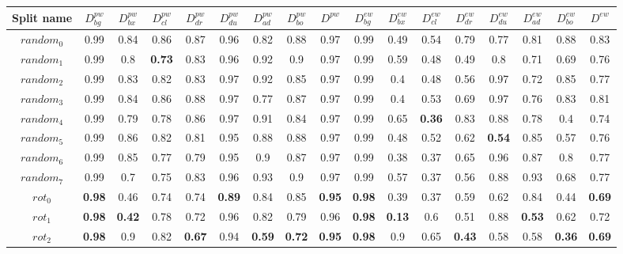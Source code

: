\documentclass{article}
\begin{document}
\begin{center} 
\begin{table}[H]
\tiny \renewcommand{\arraystretch}{1.5} \begin{tabular}{ |c|c|c|c|c|c|c|c|c||c|c|c|c|c|c|c|c| } \hline Split name & $D^{pw}_{bg}$ & $D^{pw}_{bx}$ & $D^{pw}_{cl}$ & $D^{pw}_{dr}$ & $D^{pw}_{du}$ & $D^{pw}_{ad}$ & $D^{pw}_{bo}$ & $D^{pw}$ &  $D^{ew}_{bg}$ & $D^{ew}_{bx}$ & $D^{ew}_{cl}$ & $D^{ew}_{dr}$ & $D^{ew}_{du}$ & $D^{ew}_{ad}$ & $D^{ew}_{bo}$ & $D^{ew}$ \\ [1.05ex] \hline 
$random_0$ &  0.99 & 0.84 & 0.86 & 0.87 & 0.96 & 0.82 & 0.88 & 0.97 &  0.99 & 0.49 & 0.54 & 0.79 & 0.77 & 0.81 & 0.88 & 0.83 \\ \hline 
$random_1$ &  0.99 & 0.8 & \textbf{0.73} & 0.83 & 0.96 & 0.92 & 0.9 & 0.97 &  0.99 & 0.59 & 0.48 & 0.49 & 0.8 & 0.71 & 0.69 & 0.76 \\ \hline 
$random_2$ &  0.99 & 0.83 & 0.82 & 0.83 & 0.97 & 0.92 & 0.85 & 0.97 &  0.99 & 0.4 & 0.48 & 0.56 & 0.97 & 0.72 & 0.85 & 0.77 \\ \hline 
$random_3$ &  0.99 & 0.84 & 0.86 & 0.88 & 0.97 & 0.77 & 0.87 & 0.97 &  0.99 & 0.4 & 0.53 & 0.69 & 0.97 & 0.76 & 0.83 & 0.81 \\ \hline 
$random_4$ &  0.99 & 0.79 & 0.78 & 0.86 & 0.97 & 0.91 & 0.84 & 0.97 &  0.99 & 0.65 & \textbf{0.36} & 0.83 & 0.88 & 0.78 & 0.4 & 0.74 \\ \hline 
$random_5$ &  0.99 & 0.86 & 0.82 & 0.81 & 0.95 & 0.88 & 0.88 & 0.97 &  0.99 & 0.48 & 0.52 & 0.62 & \textbf{0.54} & 0.85 & 0.57 & 0.76 \\ \hline 
$random_6$ &  0.99 & 0.85 & 0.77 & 0.79 & 0.95 & 0.9 & 0.87 & 0.97 &  0.99 & 0.38 & 0.37 & 0.65 & 0.96 & 0.87 & 0.8 & 0.77 \\ \hline 
$random_7$ &  0.99 & 0.7 & 0.75 & 0.83 & 0.96 & 0.93 & 0.9 & 0.97 &  0.99 & 0.57 & 0.37 & 0.56 & 0.88 & 0.93 & 0.68 & 0.77 \\ \hhline{|=|=|=|=|=|=|=|=|=|=|=|=|=|=|=|=|=|} 
$rot_0$ &  \textbf{0.98} & 0.46 & 0.74 & 0.74 & \textbf{0.89} & 0.84 & 0.85 & \textbf{0.95} &  \textbf{0.98} & 0.39 & 0.37 & 0.59 & 0.62 & 0.84 & 0.44 & \textbf{0.69} \\ \hline 
$rot_1$ &  \textbf{0.98} & \textbf{0.42} & 0.78 & 0.72 & 0.96 & 0.82 & 0.79 & 0.96 &  \textbf{0.98} & \textbf{0.13} & 0.6 & 0.51 & 0.88 & \textbf{0.53} & 0.62 & 0.72 \\ \hline 
$rot_2$ &  \textbf{0.98} & 0.9 & 0.82 & \textbf{0.67} & 0.94 & \textbf{0.59} & \textbf{0.72} & \textbf{0.95} &  \textbf{0.98} & 0.9 & 0.65 & \textbf{0.43} & 0.58 & 0.58 & \textbf{0.36} & \textbf{0.69} \\ \hline 

\end{tabular}
\end{table}
\end{center}
\end{document}
